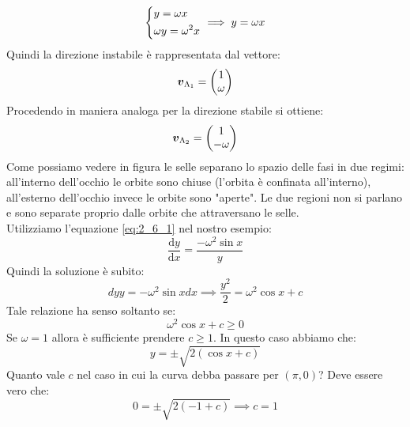 \begin{exmp}
\[\] 
\[\begin{dcases}
    y = \omega x\\
    \omega y = \omega^2x
\end{dcases}\implies  y = \omega x \] 
Quindi la direzione instabile è rappresentata dal vettore:
\[
    \boldsymbol{v}_{\Lambda_1} = \begin{pmatrix} 1 \\ \omega \end{pmatrix} 
\] 
Procedendo in maniera analoga per la direzione stabile si ottiene:
\[
    \boldsymbol{v}_{\Lambda_2} = \begin{pmatrix} 1 \\ -\omega \end{pmatrix} 
\] 
Come possiamo vedere in figura le selle separano lo spazio delle fasi in due regimi: all'interno dell'occhio le orbite sono chiuse (l'orbita è confinata all'interno), all'esterno dell'occhio invece le orbite sono "aperte". Le due regioni non si parlano e sono separate proprio dalle orbite che attraversano le selle.\\
Utilizziamo l'equazione \ref{eq:2_6_1} nel nostro esempio:
\[
    \frac{\text{d} y}{\text{d} x} = \frac{-\omega^2\sin x}{y}
\] 
Quindi la soluzione è subito:
\[
    dy y = -\omega^2\sin xdx \implies  \frac{y^2}{2} = \omega^2  \cos x + c
\] 
Tale relazione ha senso soltanto se:
\[
    \omega^2 \cos x + c \ge 0
\] 
Se $\omega  = 1$ allora è sufficiente prendere $c \ge  1$. In questo caso abbiamo che:
\[
    y = \pm \sqrt{2(\cos x + c)} 
\] 
Quanto vale $c$ nel caso in cui la curva debba passare per $(\pi, 0)$? Deve essere vero che:
\[
    0 = \pm \sqrt{2(-1 + c)} \implies  c = 1
\] 

\end{exmp}
\noindent
